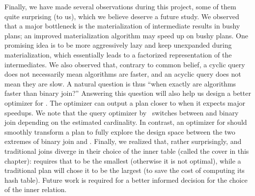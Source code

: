   Finally, we have made several observations during this project, some
  of them quite surprising (to us), which we believe deserve a future
  study.  We observed that a major bottleneck is the materialization of
  intermediate results in bushy plans; an improved materialization
  algorithm may speed up \FJ on bushy plans.  One promising idea is to
  be more aggressively lazy and keep \COLTs unexpanded during
  materialization, which essentially leads to a factorized
  representation of the intermediates.  We also observed that, contrary
  to common belief, a cyclic query does not necessarily mean \WCOJ
  algorithms are faster, and an acyclic query does not mean they are
  slow.  A natural question is thus ``when exactly are \WCOJ algorithms
  faster than binary join?''  Answering this question will also help us
  design a better optimizer for \FJ.  The optimizer can output a plan
  closer to \WCOJ when it expects major speedups.  We note that the
  query optimizer by~\cite{DBLP:journals/pvldb/FreitagBSKN20} switches
  between \GJ and binary join depending on the estimated cardinality.
  In contrast, an optimizer for \FJ should smoothly transform a \FJ plan
  to fully explore the design space between the two extremes of binary
  join and \GJ.  Finally, we realized that, rather surprisingly, \GJ and
  traditional joins diverge in their choice of the inner table (called
  the cover in this chapter): \GJ requires that to be the smallest
  (otherwise it is not optimal), while a traditional plan will chose it
  to be the largest (to save the cost of computing its hash table).
  Future work is required for a better informed decision for the choice
  of the inner relation.
  
